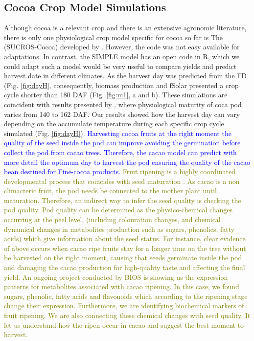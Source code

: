 \documentclass[gene,journal,article,submit,moreauthors,pdftex]{Definitions/mdpi}
\begin{document}
\subsection{Cocoa Crop Model Simulations}
Although cocoa is a relevant crop and there is an extensive agronomic literature, there is only one physiological crop model specific for cocoa so far is The (SUCROS-Cocoa) developed by \cite{zuidema2005}. However, the code was not easy available for adaptations. In contrast, the SIMPLE model has an open code in R, which we could adapt such a model would be very useful to compare yields and predict harvest date in different climates. As the harvest day was predicted from the FD (Fig. \ref{fig:dayH}, consequently, biomass production and fSolar presented a crop cycle shorter than 180 DAF (Fig. \ref{fig:m1}, a and b). These simulations are coincident with results presented by \cite{lopez2018}, where physiological maturity of coca pod varies from 140 to 162 DAF.  Our results showed how the harvest day can vary depending on the accumulate temperature during each specific crop cycle simulated (Fig. \ref{fig:dayH}). \textcolor{blue} {Harvesting cocoa fruits at the right moment the quality of the seed inside the pod can improve avoiding the germination before collect the pod from  cacao trees.  Therefore, the cacao model can predict with more detail the optimum day to harvest the pod ensuring the quality of the cacao bean  destined for Fine-cocoa products.}
\textcolor{olive} {Fruit ripening is a highly coordinated developmental process that coincides with seed maturation \citep{Osorio2013} . As cacao is a non climacteric fruit, the pod needs be connected to the mother plant until maturation. Therefore, an indirect way to infer the seed quality is checking the pod quality. Pod quality can be determined as the physico-chemical changes occurring at the peel level, (including colouration changes, and chemical dynamical changes in metabolites production such as sugars, phenolics, fatty acids) which give information about the seed status. For instance, clear evidence of above occurs when cacao ripe fruits stay for a longer time on the tree without be harvested on the right moment, causing that seeds germinate  inside the pod and damaging the cacao production for high-quality taste and affecting the final yield. 
An ongoing project conducted by BIOS is showing us the expression patterns for metabolites associated with cacao ripening. In this case, we found sugars, phenolic, fatty acids and flavonoids which according to the ripening stage change their expression.  Furthermore, we are identifying biochemical markers of fruit ripening. We are also connecting these chemical changes with seed quality. It let us understand how the ripen occur in cacao and suggest the best moment to harvest.} 
\end{document}
